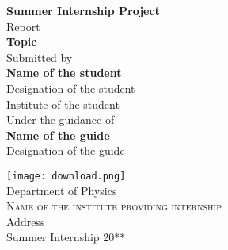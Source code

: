 \begin{titlepage}

\begin{center}

\textup{\small {\bf Summer Internship Project} \\ Report}\\[0.3in]

\Large \textbf {Topic}\\[0.7in]


       

\normalsize Submitted by \\[0.2in]
\textbf{Name of the student}\\
Designation of the student\\
Institute of the student\\

\vspace{.2in}
Under the guidance of\\[0.2in]
\textbf{Name of the guide}\\
Designation of the guide



\vspace{.3in}

\texttt{[image: download.png]}\\[0.1in]
\Large{Department of Physics}\\
\normalsize
\textsc{Name of the institute providing internship }\\
Address \\
\vspace{0.2cm}
Summer Internship 20**

\end{center}

\end{titlepage}
